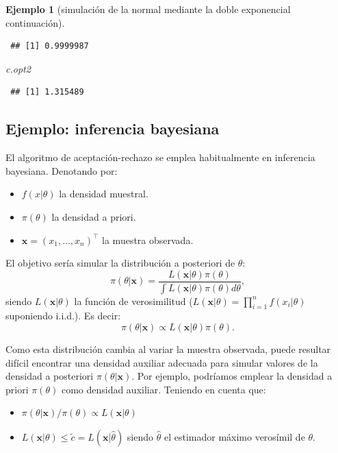 \documentclass[
]{book}
\newenvironment{Shaded}{\begin{snugshade}}{\end{snugshade}}
\newcommand{\NormalTok}[1]{#1}
\theoremstyle{break}
\newtheorem{example}{Ejemplo}[chapter]
\theoremstyle{nonumberplain}
\begin{document}
\begin{example}[simulación de la normal mediante la doble exponencial continuación]
\begin{verbatim}
 ## [1] 0.9999987
\end{verbatim}

\begin{Shaded}
\begin{Highlighting}[]
\NormalTok{c.opt2}
\end{Highlighting}
\end{Shaded}

\begin{verbatim}
 ## [1] 1.315489
\end{verbatim}

\end{example}

\hypertarget{bayes-ar}{%
\subsection{Ejemplo: inferencia bayesiana}\label{bayes-ar}}

El algoritmo de aceptación-rechazo se emplea habitualmente en inferencia bayesiana.
Denotando por:

\begin{itemize}
\item
  \(f(x|\theta)\) la densidad muestral.
\item
  \(\pi(\theta)\) la densidad a priori.
\item
  \(\mathbf{x}=(x_1,...,x_n)^{\top}\) la muestra observada.
\end{itemize}

El objetivo sería simular la distribución a posteriori de \(\theta\):
\[\pi(\theta|\mathbf{x}) = \frac{L(\mathbf{x}|\theta)\pi(\theta)}{\int L(\mathbf{x}|\theta)\pi(\theta)d\theta},\]
siendo \(L(\mathbf{x}|\theta)\) la función de verosimilitud (\(L(\mathbf{x}|\theta) = \prod\limits_{i=1}^{n}f(x_i|\theta)\) suponiendo i.i.d.).
Es decir:
\[\pi(\theta | \mathbf{x}) \propto L(\mathbf{x}| \theta)\pi(\theta).\]

Como esta distribución cambia al variar la muestra observada, puede resultar difícil encontrar una densidad auxiliar adecuada para simular valores de la densidad a posteriori \(\pi(\theta|\mathbf{x})\).
Por ejemplo, podríamos emplear la densidad a priori \(\pi(\theta)\) como densidad auxiliar.
Teniendo en cuenta que:

\begin{itemize}
\item
  \(\pi(\theta |\mathbf{x})/\pi(\theta)\propto L(\mathbf{x}|\theta)\)
\item
  \(L(\mathbf{x}|\theta)\leq \tilde{c}=L(\mathbf{x}|\hat{\theta})\) siendo
  \(\hat{\theta}\) el estimador máximo verosímil de \(\theta\).
\end{itemize}
\end{document}
